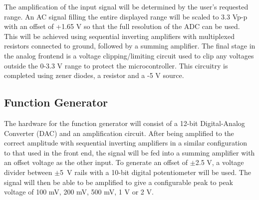 \documentclass[12pt]{report}
\begin{document}
The amplification of the input signal will be determined by the user’s requested range. An AC signal filling the entire displayed range will be scaled to 3.3 Vp-p with an offset of +1.65 V so that the full resolution of the ADC can be used. This will be achieved using sequential inverting amplifiers with multiplexed resistors connected to ground, followed by a summing amplifier. The final stage in the analog frontend is a voltage clipping/limiting circuit used to clip any voltages outside the 0-3.3 V range to protect the microcontroller. This circuitry is completed using zener diodes, a resistor and a -5 V source.

\subsection{Function Generator}
The hardware for the function generator will consist of a 12-bit Digital-Analog Converter (DAC) and an amplification circuit. After being amplified to the correct amplitude with sequential inverting amplifiers in a similar configuration to that used in the front end, the signal will be fed into a summing amplifier with an offset voltage as the other input. To generate an offset of $\pm$2.5 V, a voltage divider between \hbox{$\pm$5 V} rails with a 10-bit digital potentiometer will be used. The signal will then be able to be amplified to give a configurable peak to peak voltage of 100 mV, 200 mV, 500 mV, 1 V or 2 V.

\newpage
\end{document}
